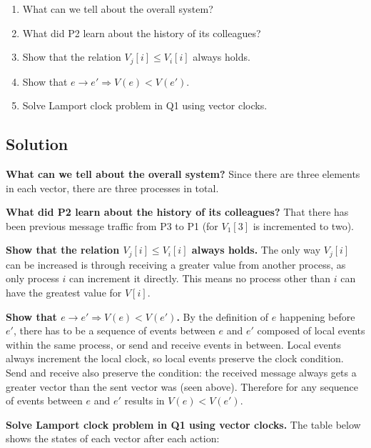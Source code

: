 \documentclass[12pt,a4paper,titlepage]{article}
\begin{document}
\begin{enumerate}
\item What can we tell about the overall system?
\item What did P2 learn about the history of its colleagues?
\item Show that the relation $V_j[i] \leq V_i[i]$ always holds.
\item Show that $e \to e' \Rightarrow V(e) < V(e')$.
\item Solve Lamport clock problem in Q1 using vector clocks.
\end{enumerate}

\subsection{Solution}

\textbf{What can we tell about the overall system?} Since there are three elements in each vector, there are three processes in total.

\textbf{What did P2 learn about the history of its colleagues?} That there has been previous message traffic from P3 to P1 (for $V_1[3]$ is incremented to two).

\textbf{Show that the relation $V_j[i] \leq V_i[i]$ always holds.} The only way $V_j[i]$ can be increased is through receiving a greater value from another process, as only process $i$ can increment it directly. This means no process other than $i$ can have the greatest value for $V[i]$.

\textbf{Show that $e \to e' \Rightarrow V(e) < V(e')$.} By the definition of $e$ happening before $e'$, there has to be a sequence of events between $e$ and $e'$ composed of local events within the same process, or send and receive events in between. Local events always increment the local clock, so local events preserve the clock condition. Send and receive also preserve the condition: the received message always gets a greater vector than the sent vector was (seen above). Therefore for any sequence of events between $e$ and $e'$ results in $V(e) < V(e')$.

\textbf{Solve Lamport clock problem in Q1 using vector clocks.} The table below shows the states of each vector after each action:
\end{document}
